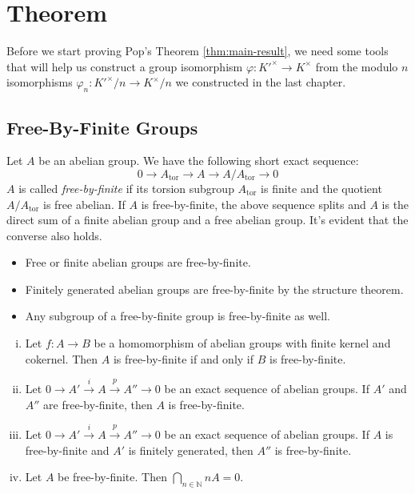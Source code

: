 \chapter{Theorem}

Before we start proving Pop's Theorem \ref{thm:main-result}, we need some tools that will help us construct a group isomorphism $\varphi: K'^\times\to K^\times$ from the modulo $n$ isomorphisms $\varphi_n: K'^\times/n\to K^\times/n$ we constructed in the last chapter.

\section{Free-By-Finite Groups}

\begin{definition}\label{5.1}
Let $A$ be an abelian group. We have the following short exact sequence:
\[0\longrightarrow A_\text{tor} \longrightarrow A\longrightarrow A/A_\text{tor}\longrightarrow 0 \]
$A$ is called \textit{free-by-finite} if its torsion subgroup $A_\text{tor}$ is finite and the quotient $A/A_\text{tor}$ is free abelian. If $A$ is free-by-finite, the above sequence splits and $A$ is the direct sum of a finite abelian group and a free abelian group. It's evident that the converse also holds.
\end{definition}

\begin{example}
\begin{itemize}
\item Free or finite abelian groups are free-by-finite.
\item Finitely generated abelian groups are free-by-finite by the structure theorem.
\item Any subgroup of a free-by-finite group is free-by-finite as well.
\end{itemize}
\end{example}

\begin{lemma}\label{5.2}
\begin{enumerate}[(i)]
\item Let $f: A\to B$ be a homomorphism of abelian groups with finite kernel and cokernel. Then $A$ is free-by-finite if and only if $B$ is free-by-finite.
\item Let $0\longrightarrow A'\stackrel{i}{\longrightarrow}A\stackrel{p}{\longrightarrow}A''\longrightarrow 0$ be an exact sequence of abelian groups. If $A'$ and $A''$ are free-by-finite, then $A$ is free-by-finite. 
\item Let $0\longrightarrow A'\stackrel{i}{\longrightarrow}A\stackrel{p}{\longrightarrow}A''\longrightarrow 0$ be an exact sequence of abelian groups. If $A$ is free-by-finite and $A'$ is finitely generated, then $A''$ is free-by-finite.
\item Let $A$ be free-by-finite. Then $\bigcap_{n\in\mathbb{N}}nA=0$.
\end{enumerate}
\end{lemma}

